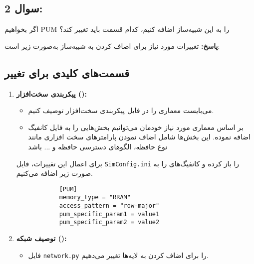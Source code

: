\documentclass[12pt]{exam}
\begin{document}
\begin{questions}
	
	
	
	
	
	
	
	
	
	
	
	
	\subsection*{سوال 2:}
	
	اگر بخواهیم PUM را به این شبیه‌ساز اضافه کنیم، کدام قسمت باید تغییر کند؟
	
	
\textbf{پاسخ:‌ }
تغییرات مورد نیاز برای اضاف کردن  به شبیه‌ساز  به‌صورت زیر است:

\subsection*{قسمت‌های کلیدی برای تغییر}

\begin{enumerate}
	\item \textbf{پیکربندی سخت‌افزار ():}
	\begin{itemize}
		\item می‌بایست معماری  را در فایل پیکربندی سخت‌افزار توصیف کنیم.
		
		\item بر اساس معماری مورد نیاز خودمان می‌توانیم بخش‌هایی را به فایل کانفیگ اضافه نموده. این بخش‌ها شامل اضاف نمودن پارامتر‌های سخت افزاری  مانند نوع حافظه، الگو‌های دسترسی حافظه و ... باشد
	\end{itemize}
	
	
	
	
برای اعمال این تغییرات، فایل \texttt{SimConfig.ini} را باز کرده و کانفیگ‌های  را به صورت زیر اضافه می‌کنیم.
	\begin{latin}
		\begin{verbatim}
			[PUM]
			memory_type = "RRAM"
			access_pattern = "row-major"
			pum_specific_param1 = value1
			pum_specific_param2 = value2
		\end{verbatim} 
	\end{latin}
	
	
	
	
	
	
	

	
	
	\item \textbf{توصیف شبکه ():}
	\begin{itemize}
		\item فایل \texttt{network.py} را برای اضاف کردن  به لایه‌ها تغییر می‌دهیم.
		

\end{itemize}
\end{enumerate}
\end{questions}
\end{document}
